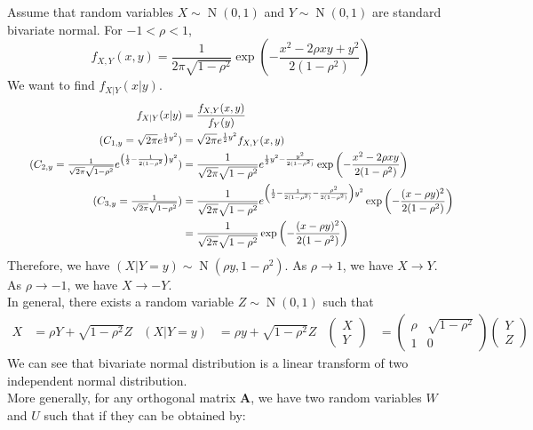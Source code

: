 \documentclass{huhtakm-template-book}
\DeclareMathOperator{\N}{N}
\begin{document}
\newpage
\begin{eg}
	Assume that random variables $X\sim\N(0,1)$ and $Y\sim\N(0,1)$ are standard bivariate normal. For $-1<\rho<1$,
	\begin{equation*}
		f_{X,Y}(x,y)=\frac{1}{2\pi\sqrt{1-\rho^{2}}}\exp\left(-\frac{x^{2}-2\rho xy+y^{2}}{2(1-\rho^{2})}\right)
	\end{equation*}
	We want to find $f_{X|Y}(x|y)$.
	\begin{align*}
		f_{X|Y}(x|y)&=\frac{f_{X,Y}(x,y)}{f_{Y}(y)}\\
		\tag{$C_{1,y}=\sqrt{2\pi}e^{\frac{1}{2}y^{2}}$}
		&=\sqrt{2\pi}e^{\frac{1}{2}y^{2}}f_{X,Y}(x,y)\\
		\tag{$C_{2,y}=\frac{1}{\sqrt{2\pi}\sqrt{1-\rho^{2}}}e^{\left(\frac{1}{2}-\frac{1}{2(1-\rho^{2}}\right)y^{2}}$}
		&=\frac{1}{\sqrt{2\pi}\sqrt{1-\rho^{2}}}e^{\frac{1}{2}y^{2}-\frac{y^{2}}{2(1-\rho^{2})}}\exp\left(-\frac{x^{2}-2\rho xy}{2(1-\rho^{2})}\right)\\
		\tag{$C_{3,y}=\frac{1}{\sqrt{2\pi}\sqrt{1-\rho^{2}}}$}
		&=\frac{1}{\sqrt{2\pi}{\sqrt{1-\rho^{2}}}}e^{\left(\frac{1}{2}-\frac{1}{2(1-\rho^{2})}-\frac{\rho^{2}}{2(1-\rho^{2})}\right)y^{2}}\exp\left(-\frac{(x-\rho y)^{2}}{2(1-\rho^{2})}\right)\\
		&=\frac{1}{\sqrt{2\pi}\sqrt{1-\rho^{2}}}\exp\left(-\frac{(x-\rho y)^{2}}{2(1-\rho^{2})}\right)
	\end{align*}
	Therefore, we have $(X|Y=y)\sim\N(\rho y,1-\rho^{2})$. As $\rho\to 1$, we have $X\to Y$. As $\rho\to -1$, we have $X\to -Y$.\\
	In general, there exists a random variable $Z\sim\N(0,1)$ such that
	\begin{align*}
		X&=\rho Y+\sqrt{1-\rho^{2}}Z & (X|Y=y)&=\rho y+\sqrt{1-\rho^{2}}Z & \begin{pmatrix}
			X\\
			Y
		\end{pmatrix}&=\begin{pmatrix}
			\rho & \sqrt{1-\rho^{2}}\\
			1 & 0
		\end{pmatrix}\begin{pmatrix}
			Y\\
			Z
		\end{pmatrix}
	\end{align*}
	We can see that bivariate normal distribution is a linear transform of two independent normal distribution.\\
	More generally, for any orthogonal matrix $\mathbf{A}$, we have two random variables $W$ and $U$ such that if they can be obtained by:

\end{eg}
\end{document}
